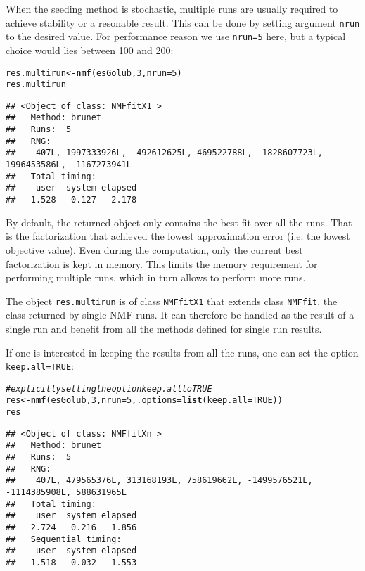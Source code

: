 \documentclass[a4paper]{article}\usepackage[]{graphicx}\usepackage[]{color}
\makeatletter
\newcommand{\hlnum}[1]{\textcolor[rgb]{0.686,0.059,0.569}{#1}}%
\newcommand{\hlcom}[1]{\textcolor[rgb]{0.678,0.584,0.686}{\textit{#1}}}%
\newcommand{\hlstd}[1]{\textcolor[rgb]{0.345,0.345,0.345}{#1}}%
\newcommand{\hlkwb}[1]{\textcolor[rgb]{0.69,0.353,0.396}{#1}}%
\newcommand{\hlkwc}[1]{\textcolor[rgb]{0.333,0.667,0.333}{#1}}%
\newcommand{\hlkwd}[1]{\textcolor[rgb]{0.737,0.353,0.396}{\textbf{#1}}}%
\newenvironment{kframe}{%
 \def\at@end@of@kframe{}%
 \ifinner\ifhmode%
  \def\at@end@of@kframe{\end{minipage}}%
  \begin{minipage}{\columnwidth}%
 \fi\fi%
 \def\FrameCommand##1{\hskip\@totalleftmargin \hskip-\fboxsep
 \colorbox{shadecolor}{##1}\hskip-\fboxsep
     \hskip-\linewidth \hskip-\@totalleftmargin \hskip\columnwidth}%
 \MakeFramed {\advance\hsize-\width
   \@totalleftmargin\z@ \linewidth\hsize
   \@setminipage}}%
 {\par\unskip\endMakeFramed%
 \at@end@of@kframe}
\newenvironment{knitrout}{}{} %
\let\code=\texttt
\makeatother
\begin{document}
When the seeding method is stochastic, multiple runs are usually required to achieve stability or a resonable result.
This can be done by setting argument \code{nrun} to the desired value. 
For performance reason we use \code{nrun=5} here, but a typical choice would lies between 100 and 200:  

\begin{knitrout}
\color{fgcolor}\begin{kframe}
\begin{alltt}
\hlstd{res.multirun} \hlkwb{<-} \hlkwd{nmf}\hlstd{(esGolub,} \hlnum{3}\hlstd{,} \hlkwc{nrun} \hlstd{=} \hlnum{5}\hlstd{)}
\hlstd{res.multirun}
\end{alltt}
\begin{verbatim}
## <Object of class: NMFfitX1 >
##   Method: brunet 
##   Runs:  5 
##   RNG:
##    407L, 1997333926L, -492612625L, 469522788L, -1828607723L, 1996453586L, -1167273941L 
##   Total timing:
##    user  system elapsed 
##   1.528   0.127   2.178
\end{verbatim}
\end{kframe}
\end{knitrout}


By default, the returned object only contains the best fit over all the runs.
That is the factorization that achieved the lowest approximation error (i.e. the lowest objective value).
Even during the computation, only the current best factorization is kept in memory.
This limits the memory requirement for performing multiple runs, which in turn allows to perform more runs.

The object \code{res.multirun} is of class \code{NMFfitX1} that extends class \code{NMFfit}, the class returned by single NMF runs. 
It can therefore be handled as the result of a single run and benefit from all the methods defined for single run results.

\medskip
If one is interested in keeping the results from all the runs, one can set the option \code{keep.all=TRUE}:

\begin{knitrout}
\color{fgcolor}\begin{kframe}
\begin{alltt}
\hlcom{# explicitly setting the option keep.all to TRUE}
\hlstd{res} \hlkwb{<-} \hlkwd{nmf}\hlstd{(esGolub,} \hlnum{3}\hlstd{,} \hlkwc{nrun} \hlstd{=} \hlnum{5}\hlstd{,} \hlkwc{.options} \hlstd{=} \hlkwd{list}\hlstd{(}\hlkwc{keep.all} \hlstd{=} \hlnum{TRUE}\hlstd{))}
\hlstd{res}
\end{alltt}
\begin{verbatim}
## <Object of class: NMFfitXn >
##   Method: brunet 
##   Runs:  5 
##   RNG:
##    407L, 479565376L, 313168193L, 758619662L, -1499576521L, -1114385908L, 588631965L 
##   Total timing:
##    user  system elapsed 
##   2.724   0.216   1.856 
##   Sequential timing:
##    user  system elapsed 
##   1.518   0.032   1.553
\end{verbatim}
\end{kframe}
\end{knitrout}
\end{document}
